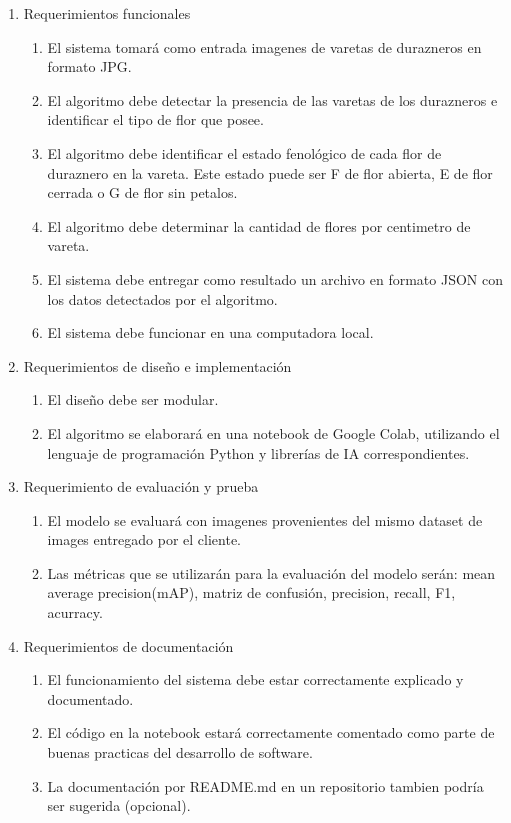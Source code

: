 \documentclass[
11pt, %
codirector, %
]{charter}
\begin{document}
\begin{enumerate}
	\item Requerimientos funcionales
		\begin{enumerate}
			\item El sistema tomará como entrada imagenes de varetas de durazneros en formato JPG.			
			\item El algoritmo debe detectar la presencia de las varetas de los durazneros e identificar el tipo de flor que posee.			        \item El algoritmo debe identificar el estado fenológico de cada flor de duraznero en la vareta. Este estado puede ser F de flor abierta, E de flor cerrada o G de flor sin petalos. 
			\item El algoritmo debe determinar la cantidad de flores por centimetro de vareta.
			\item El sistema debe entregar como resultado un archivo en formato JSON con los datos detectados por el algoritmo.
			\item El sistema debe funcionar en una computadora local.
		\end{enumerate}
	\item Requerimientos de diseño e implementación
		\begin{enumerate}
			\item El diseño debe ser modular.
			\item El algoritmo se elaborará en una notebook de Google Colab, utilizando el lenguaje de  programación Python y librerías de IA correspondientes. 
		\end{enumerate}
	\item Requerimiento de evaluación y prueba
	\begin{enumerate}
			\item El modelo se evaluará con imagenes provenientes del mismo dataset de images entregado por el cliente.
			 \item Las métricas que se utilizarán para la evaluación del modelo serán: mean average precision(mAP), matriz de confusión, precision, recall, F1, acurracy.
		\end{enumerate}
	\item Requerimientos de documentación
	\begin{enumerate}
			\item El funcionamiento del sistema debe estar correctamente explicado y documentado.
			 \item El código en la notebook estará correctamente comentado como parte de buenas practicas del desarrollo de software.
			 \item La documentación por README.md en un repositorio tambien podría ser sugerida (opcional).
		\end{enumerate}
\end{enumerate}
\end{document}
